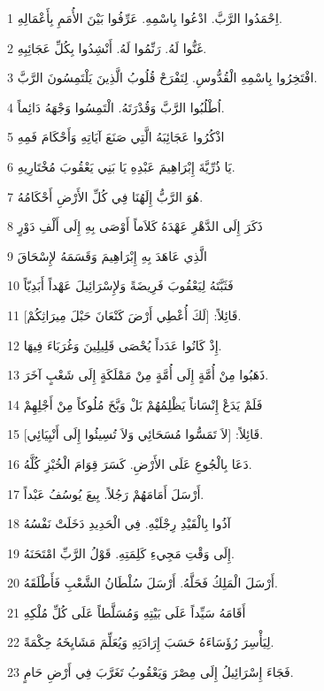\par 1 اِحْمَدُوا الرَّبَّ. ادْعُوا بِاسْمِهِ. عَرِّفُوا بَيْنَ الأُمَمِ بِأَعْمَالِهِ.
\par 2 غَنُّوا لَهُ. رَنِّمُوا لَهُ. أَنْشِدُوا بِكُلِّ عَجَائِبِهِ.
\par 3 افْتَخِرُوا بِاسْمِهِ الْقُدُّوسِ. لِتَفْرَحْ قُلُوبُ الَّذِينَ يَلْتَمِسُونَ الرَّبَّ.
\par 4 اُطْلُبُوا الرَّبَّ وَقُدْرَتَهُ. الْتَمِسُوا وَجْهَهُ دَائِماً.
\par 5 اذْكُرُوا عَجَائِبَهُ الَّتِي صَنَعَ آيَاتِهِ وَأَحْكَامَ فَمِهِ
\par 6 يَا ذُرِّيَّةَ إِبْرَاهِيمَ عَبْدِهِ يَا بَنِي يَعْقُوبَ مُخْتَارِيهِ.
\par 7 هُوَ الرَّبُّ إِلَهُنَا فِي كُلِّ الأَرْضِ أَحْكَامُهُ.
\par 8 ذَكَرَ إِلَى الدَّهْرِ عَهْدَهُ كَلاَماً أَوْصَى بِهِ إِلَى أَلْفِ دَوْرٍ
\par 9 الَّذِي عَاهَدَ بِهِ إِبْرَاهِيمَ وَقَسَمَهُ لإِسْحَاقَ
\par 10 فَثَبَّتَهُ لِيَعْقُوبَ فَرِيضَةً وَلإِسْرَائِيلَ عَهْداً أَبَدِيّاً
\par 11 قَائِلاً: [لَكَ أُعْطِي أَرْضَ كَنْعَانَ حَبْلَ مِيرَاثِكُمْ].
\par 12 إِذْ كَانُوا عَدَداً يُحْصَى قَلِيلِينَ وَغُرَبَاءَ فِيهَا.
\par 13 ذَهَبُوا مِنْ أُمَّةٍ إِلَى أُمَّةٍ مِنْ مَمْلَكَةٍ إِلَى شَعْبٍ آخَرَ.
\par 14 فَلَمْ يَدَعْ إِنْسَاناً يَظْلِمُهُمْ بَلْ وَبَّخَ مُلُوكاً مِنْ أَجْلِهِمْ
\par 15 قَائِلاً: [لاَ تَمَسُّوا مُسَحَائِي وَلاَ تُسِيئُوا إِلَى أَنْبِيَائِي].
\par 16 دَعَا بِالْجُوعِ عَلَى الأَرْضِ. كَسَرَ قِوَامَ الْخُبْزِ كُلَّهُ.
\par 17 أَرْسَلَ أَمَامَهُمْ رَجُلاً. بِيعَ يُوسُفُ عَبْداً.
\par 18 آذُوا بِالْقَيْدِ رِجْلَيْهِ. فِي الْحَدِيدِ دَخَلَتْ نَفْسُهُ
\par 19 إِلَى وَقْتِ مَجِيءِ كَلِمَتِهِ. قَوْلُ الرَّبِّ امْتَحَنَهُ.
\par 20 أَرْسَلَ الْمَلِكُ فَحَلَّهُ. أَرْسَلَ سُلْطَانُ الشَّعْبِ فَأَطْلَقَهُ.
\par 21 أَقَامَهُ سَيِّداً عَلَى بَيْتِهِ وَمُسَلَّطاً عَلَى كُلِّ مُلْكِهِ
\par 22 لِيَأْسِرَ رُؤَسَاءَهُ حَسَبَ إِرَادَتِهِ وَيُعَلِّمَ مَشَايِخَهُ حِكْمَةً.
\par 23 فَجَاءَ إِسْرَائِيلُ إِلَى مِصْرَ وَيَعْقُوبُ تَغَرَّبَ فِي أَرْضِ حَامٍ.
